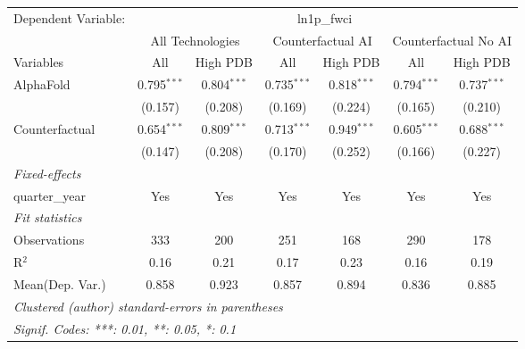 \begingroup
\centering
\begin{tabular}{lcccccc}
   \tabularnewline \midrule \midrule
   Dependent Variable: & \multicolumn{6}{c}{ln1p\_fwci}\\
 & \multicolumn{2}{c}{All Technologies} & \multicolumn{2}{c}{Counterfactual AI} & \multicolumn{2}{c}{Counterfactual No AI} \\
\cmidrule(lr){1-1}\cmidrule(lr){2-3} \cmidrule(lr){4-5} \cmidrule(lr){6-7}
Variables & \multicolumn{1}{c}{All} & \multicolumn{1}{c}{High PDB} & \multicolumn{1}{c}{All} & \multicolumn{1}{c}{High PDB} & \multicolumn{1}{c}{All} & \multicolumn{1}{c}{High PDB} \\
\cmidrule(lr){1-1}\cmidrule(lr){2-2} \cmidrule(lr){3-3} \cmidrule(lr){4-4} \cmidrule(lr){5-5} \cmidrule(lr){6-6} \cmidrule(lr){7-7}
   AlphaFold      & 0.795$^{***}$ & 0.804$^{***}$ & 0.735$^{***}$ & 0.818$^{***}$ & 0.794$^{***}$ & 0.737$^{***}$\\   
                  & (0.157)       & (0.208)       & (0.169)       & (0.224)       & (0.165)       & (0.210)\\   
   Counterfactual & 0.654$^{***}$ & 0.809$^{***}$ & 0.713$^{***}$ & 0.949$^{***}$ & 0.605$^{***}$ & 0.688$^{***}$\\   
                  & (0.147)       & (0.208)       & (0.170)       & (0.252)       & (0.166)       & (0.227)\\   
   \midrule
   \emph{Fixed-effects}\\
   quarter\_year  & Yes           & Yes           & Yes           & Yes           & Yes           & Yes\\  
   \midrule
   \emph{Fit statistics}\\
   Observations   & 333           & 200           & 251           & 168           & 290           & 178\\  
   R$^2$          & 0.16          & 0.21          & 0.17          & 0.23          & 0.16          & 0.19\\  
Mean(Dep. Var.) & 0.858 & 0.923 & 0.857 & 0.894 & 0.836 & 0.885 \\
   \midrule \midrule
   \multicolumn{7}{l}{\emph{Clustered (author) standard-errors in parentheses}}\\
   \multicolumn{7}{l}{\emph{Signif. Codes: ***: 0.01, **: 0.05, *: 0.1}}\\
\end{tabular}
\par\endgroup
